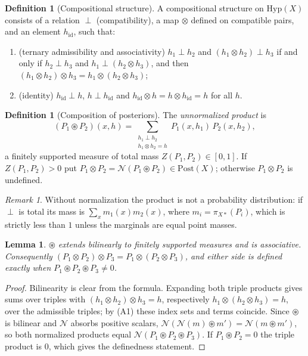 \documentclass[11pt]{article}
\newtheorem{lemma}[theorem]{Lemma}
\theoremstyle{definition}
\newtheorem{definition}[theorem]{Definition}
\theoremstyle{remark}
\newtheorem{remark}[theorem]{Remark}
\newcommand{\Hyp}{\mathrm{Hyp}}
\newcommand{\Post}{\mathrm{Post}}
\newcommand{\hid}{h_{\mathrm{id}}}
\newcommand{\N}{\mathcal{N}}
\newcommand{\cp}{\circledast}
\begin{document}
\begin{definition}[Compositional structure]\label{def:comp}
A compositional structure on $\Hyp(X)$ consists of a relation $\perp$ (compatibility), a map
$\otimes$ defined on compatible pairs, and an element $\hid$, such that:
\begin{enumerate}[label=(A\arabic*)]
\item (ternary admissibility and associativity) $h_1\perp h_2$ and $(h_1\otimes h_2)\perp h_3$ if and
  only if $h_2\perp h_3$ and $h_1\perp(h_2\otimes h_3)$, and then
  $(h_1\otimes h_2)\otimes h_3=h_1\otimes(h_2\otimes h_3)$;
\item (identity) $\hid\perp h$, $h\perp\hid$ and $\hid\otimes h=h\otimes\hid=h$ for all $h$.
\end{enumerate}
\end{definition}

\begin{definition}[Composition of posteriors]
The \emph{unnormalized product} is
\[
(P_1\cp P_2)(x,h)=\sum_{\substack{h_1\perp h_2\\ h_1\otimes h_2=h}}P_1(x,h_1)\,P_2(x,h_2),
\]
a finitely supported measure of total mass $Z(P_1,P_2)\in[0,1]$. If $Z(P_1,P_2)>0$ put
$P_1\otimes P_2=\N(P_1\cp P_2)\in\Post(X)$; otherwise $P_1\otimes P_2$ is undefined.
\end{definition}

\begin{remark}
Without normalization the product is not a probability distribution: if $\perp$ is total its mass
is $\sum_x m_1(x)m_2(x)$, where $m_i=\pi_{X*}(P_i)$, which is strictly less than $1$ unless the
marginals are equal point masses.
\end{remark}

\begin{lemma}\label{lem:assoc}
$\cp$ extends bilinearly to finitely supported measures and is associative. Consequently
$(P_1\otimes P_2)\otimes P_3=P_1\otimes(P_2\otimes P_3)$, and either side is defined exactly when
$P_1\cp P_2\cp P_3\neq 0$.
\end{lemma}
\begin{proof}
Bilinearity is clear from the formula. Expanding both triple products gives sums over triples with
$(h_1\otimes h_2)\otimes h_3=h$, respectively $h_1\otimes(h_2\otimes h_3)=h$, over the admissible
triples; by (A1) these index sets and terms coincide. Since $\cp$ is bilinear and $\N$ absorbs
positive scalars, $\N(\N(m)\cp m')=\N(m\cp m')$, so both normalized products equal
$\N(P_1\cp P_2\cp P_3)$. If $P_1\cp P_2=0$ the triple product is $0$, which gives the definedness
statement.
\end{proof}
\end{document}
